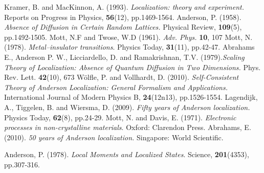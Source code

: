 \documentclass[10pt,a4paper]{article}
\begin{document}
\begin{thebibliography}{99}
Kramer, B. and MacKinnon, A. (1993). \emph{Localization: theory and experiment.} Reports on Progress in Physics, \textbf{56}(12), pp.1469-1564.
Anderson, P. (1958). \emph{Absence of Diffusion in Certain Random Lattices.} Physical Review, \textbf{109}(5), pp.1492-1505.
Mott, N.F and Twose, W.D (1961). \emph{Adv. Phys.} \textbf{10}, 107
Mott, N. (1978). \emph{Metal–insulator transitions}. Physics Today, \textbf{31}(11), pp.42-47.
Abrahams E., Anderson P. W., Licciardello, D. and Ramakrishnan, T.V. (1979).\emph{Scaling Theory of Localization: Absence of Quantum Diffusion in Two Dimensions.} Phys. Rev. Lett. \textbf{42}(10), 673
Wölfle, P. and Vollhardt, D. (2010). \emph{Self-Consistent Theory of Anderson Localization: General Formalism and Applications.} International Journal of Modern Physics B, \textbf{24}(12n13), pp.1526-1554.
Lagendijk, A., Tiggelen, B. and Wiersma, D. (2009). \emph{Fifty years of Anderson localization.} Physics Today, \textbf{62}(8), pp.24-29.
Mott, N. and Davis, E. (1971). \emph{Electronic processes in non-crystalline materials}. Oxford: Clarendon Press.
Abrahams, E. (2010). \emph{50 years of Anderson localization.} Singapore: World Scientific.

Anderson, P. (1978). \emph{Local Moments and Localized States}. Science, \textbf{201}(4353), pp.307-316.
\end{thebibliography}
\end{document}

